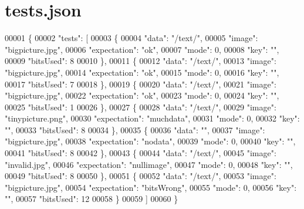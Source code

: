\hypertarget{tests_8json_source}{}\section{tests.\+json}
\label{tests_8json_source}

\begin{DoxyCode}
00001 \{
00002     "tests": [
00003         \{
00004             "data": "/text/",
00005             "image": "bigpicture.jpg",
00006             "expectation": "ok",
00007             "mode": 0,
00008             "key": "",
00009             "bitsUsed": 8
00010         \},
00011         \{
00012             "data": "/text/",
00013             "image": "bigpicture.jpg",
00014             "expectation": "ok",
00015             "mode": 0,
00016             "key": "",
00017             "bitsUsed": 7
00018         \},
00019         \{
00020             "data": "/text/",
00021             "image": "bigpicture.jpg",
00022             "expectation": "ok",
00023             "mode": 0,
00024             "key": "",
00025             "bitsUsed": 1
00026         \},
00027         \{
00028             "data": "/text/",
00029             "image": "tinypicture.png",
00030             "expectation": "muchdata",
00031             "mode": 0,
00032             "key": "",
00033             "bitsUsed": 8
00034         \},
00035         \{
00036             "data": "",
00037             "image": "bigpicture.jpg",
00038             "expectation": "nodata",
00039             "mode": 0,
00040             "key": "",
00041             "bitsUsed": 8
00042         \},
00043         \{
00044             "data": "/text/",
00045             "image": "invalid.jpg",
00046             "expectation": "nullimage",
00047             "mode": 0,
00048             "key": "",
00049             "bitsUsed": 8
00050         \},
00051         \{
00052             "data": "/text/",
00053             "image": "bigpicture.jpg",
00054             "expectation": "bitsWrong",
00055             "mode": 0,
00056             "key": "",
00057             "bitsUsed": 12
00058         \}
00059     ]
00060 \}
\end{DoxyCode}
